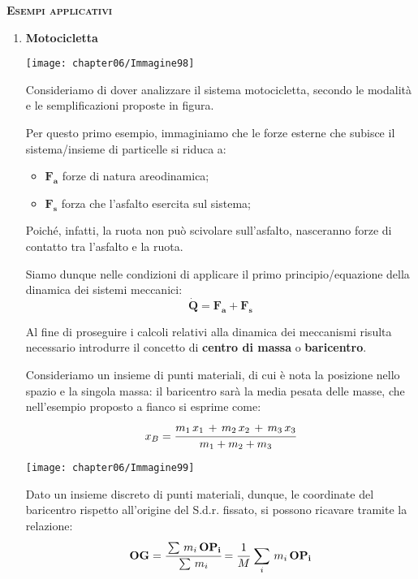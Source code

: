 	\begin{center}
	{\scshape{\bfseries Esempi applicativi}}
	\end{center}
	\begin{enumerate}
	\item \textbf{Motocicletta}
	
	\begin{minipage}{.35\textwidth}
	\centering
	\texttt{[image: chapter06/Immagine98]}
	\end{minipage}
	\hfill
	\begin{minipage}{.6\textwidth}
		
	Consideriamo di dover analizzare il sistema motocicletta, secondo le modalità e le semplificazioni proposte in figura.
	
	Per questo primo esempio, immaginiamo che le forze esterne che subisce il sistema/insieme di particelle si riduca a:
	\begin{itemize}
	\item $\mathbf{F_a}$ forze di natura areodinamica;
	\item $\mathbf{F_s}$ forza che l'asfalto esercita sul sistema;
	\end{itemize}
	Poiché, infatti, la ruota non può scivolare sull'asfalto, nasceranno forze di contatto tra l'asfalto e la ruota.
	
	Siamo dunque nelle condizioni di applicare il primo principio/equazione della dinamica dei sistemi meccanici:
	\[
	\dot{\mathbf{Q}} = \mathbf{F_a} + \mathbf{F_s}
	\]
	
	Al fine di proseguire i calcoli relativi alla dinamica dei meccanismi risulta necessario introdurre il concetto di \textbf{centro di massa} o \textbf{baricentro}.
		\end{minipage}
		
		\begin{minipage}{.65\textwidth}
		Consideriamo un insieme di punti materiali, di cui è nota la posizione nello spazio e la singola massa: il baricentro sarà la media pesata delle masse, che nell'esempio proposto a fianco si esprime come:
		\[
		x_B = \cfrac{m_1\,x_1\,+\,m_2\,x_2\,+\,m_3\,x_3}{m_1+m_2+m_3}
		\]
\end{minipage}
\hfill
\begin{minipage}{.35\textwidth}
\centering
\texttt{[image: chapter06/Immagine99]}
\end{minipage}

		Dato un insieme discreto di punti materiali, dunque, le coordinate del baricentro rispetto all'origine del S.d.r. fissato, si possono ricavare tramite la relazione:
		\[
		\mathbf{OG} = \cfrac{\sum\,m_i\,\mathbf{OP_i}}{\sum\,m_i} = \cfrac{1}{M}\,\sum_i\,m_i\,\mathbf{OP_i}
		\]
		

\end{enumerate}
